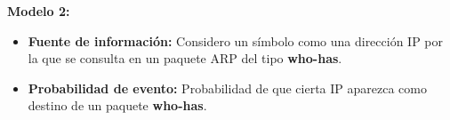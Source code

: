 \textbf{Modelo 2:}
\begin{itemize}
\item \textbf{Fuente de información:} Considero un símbolo como una dirección IP por la que se consulta en un paquete ARP del tipo \textbf{who-has}.
\item \textbf{Probabilidad de evento:} Probabilidad de que cierta IP aparezca como destino de un paquete \textbf{who-has}.
\end{itemize}
